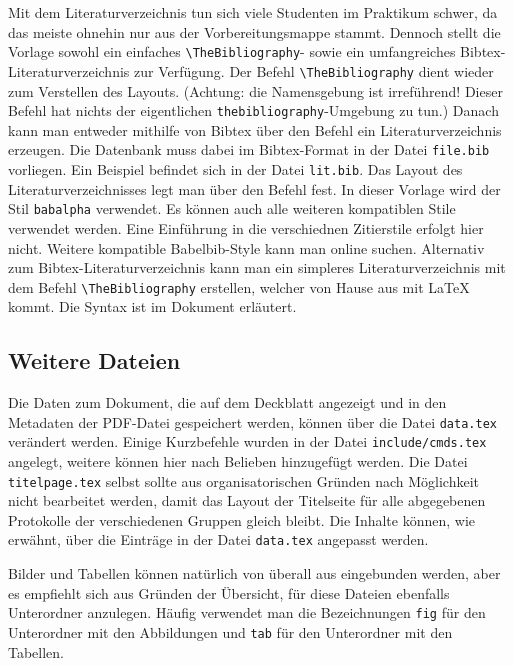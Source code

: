Mit dem Literaturverzeichnis tun sich viele Studenten im Praktikum schwer, da das meiste ohnehin nur aus der Vorbereitungsmappe stammt. Dennoch stellt die Vorlage sowohl ein einfaches \verb|\TheBibliography|- sowie ein umfangreiches Bibtex-Literaturverzeichnis zur Verfügung. Der Befehl \verb|\TheBibliography| dient wieder zum Verstellen des Layouts. (Achtung: die Namensgebung ist irreführend! Dieser Befehl hat nichts der eigentlichen \verb|thebibliography|-Umgebung zu tun.) Danach kann man entweder mithilfe von Bibtex über den Befehl \verb|| ein Literaturverzeichnis erzeugen. Die Datenbank muss dabei im Bibtex-Format in der Datei \verb|file.bib| vorliegen. Ein Beispiel befindet sich in der Datei \verb|lit.bib|. Das Layout des Literaturverzeichnisses legt man über den Befehl \verb|| fest. In dieser Vorlage wird der Stil \verb|babalpha| verwendet. Es können auch alle weiteren kompatiblen Stile verwendet werden. Eine Einführung in die verschiednen Zitierstile erfolgt  hier nicht. Weitere kompatible Babelbib-Style kann man online suchen. Alternativ zum Bibtex-Literaturverzeichnis kann man ein simpleres Literaturverzeichnis mit dem Befehl \verb|\TheBibliography| erstellen, welcher von Hause aus mit LaTeX kommt. Die Syntax ist im Dokument erläutert.

\subsection{Weitere Dateien}
Die Daten zum Dokument, die auf dem Deckblatt angezeigt und in den Metadaten der PDF-Datei gespeichert werden, können über die Datei \verb|data.tex| verändert werden. Einige Kurzbefehle wurden in der Datei \verb|include/cmds.tex| angelegt, weitere können hier nach Belieben hinzugefügt werden. Die Datei \verb|titelpage.tex| selbst sollte aus organisatorischen Gründen nach Möglichkeit nicht bearbeitet werden, damit das Layout der Titelseite für alle abgegebenen Protokolle der verschiedenen Gruppen gleich bleibt. Die Inhalte können, wie erwähnt, über die Einträge in der Datei \verb|data.tex| angepasst werden.

Bilder und Tabellen können natürlich von überall aus eingebunden werden, aber es empfiehlt sich aus Gründen der Übersicht, für diese Dateien ebenfalls Unterordner anzulegen. Häufig verwendet man die Bezeichnungen \verb|fig| für den Unterordner mit den Abbildungen und \verb|tab| für den Unterordner mit den Tabellen.



